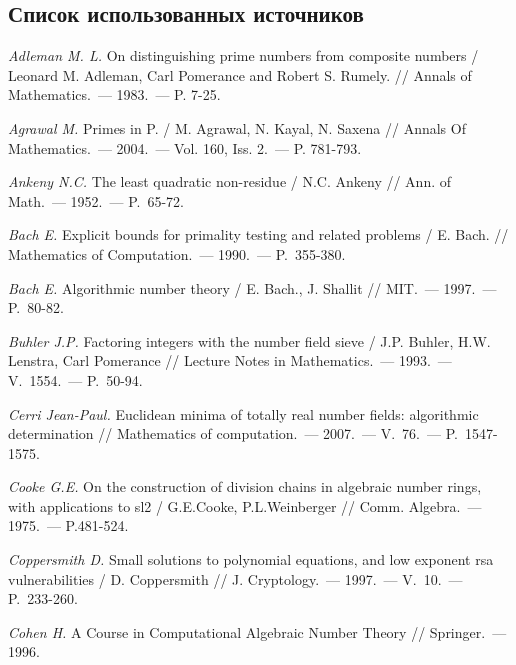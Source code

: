 \renewcommand{\bibname}{БИБЛИОГРАФИЧЕСКИЙ СПИСОК}

\begin{thebibliography}{99}
\section*{Список использованных источников}
\vspace{-12pt}

    \textit{Adleman M. L.} On distinguishing prime numbers from composite numbers / Leonard M. Adleman, Carl Pomerance and Robert S. Rumely. // Annals of Mathematics.~--- 1983.~--- P. 7-25.
    
    \textit{Agrawal M.} Primes in P. / M. Agrawal, N. Kayal, N. Saxena // Annals Of Mathematics.~--- 2004.~--- Vol. 160, Iss. 2.~--- P. 781-793.
    
    \textit{Ankeny N.C.} The least quadratic non-residue / N.C. Ankeny // Ann. of Math.~--- 1952.~--- P.~65-72.

    \textit{Bach E.} Explicit bounds for primality testing and related problems / E. Bach. // Mathematics of Computation.~--- 1990.~--- P.~355-380.
    
    \textit{Bach E.} Algorithmic number theory / E. Bach., J. Shallit // MIT.~--- 1997.~--- P.~80-82.
    
    \textit{Buhler J.P.} Factoring integers with the number field sieve / J.P. Buhler, H.W. Lenstra, Carl Pomerance // Lecture Notes in Mathematics.~--- 1993.~--- V.~1554.~--- P.~50-94.

    \textit{Cerri Jean-Paul.} Euclidean minima of totally real number fields: algorithmic determination // Mathematics of computation.~--- 2007.~--- V.~76.~--- {P.}~1547-1575.

    \textit{Cooke G.E.} On the construction of division chains in algebraic number rings, with applications to sl2 / G.E.Cooke, P.L.Weinberger // Comm. Algebra.~--- 1975.~--- P.481-524.

    \textit{Coppersmith D.} Small solutions to polynomial equations, and low exponent rsa vulnerabilities / D. Coppersmith // J. Cryptology.~--- 1997.~--- V.~10.~--- P.~233-260.

    \textit{Cohen H.} A Course in Computational Algebraic Number Theory // Springer.~--- 1996.
    

\end{thebibliography}
